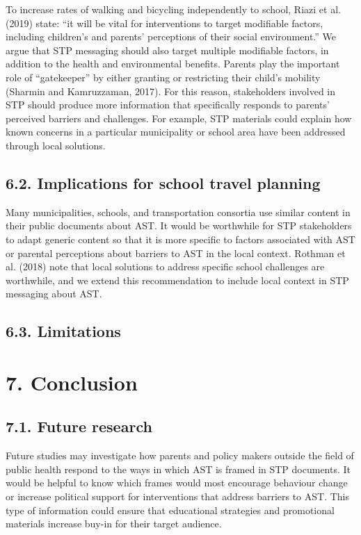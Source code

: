 \documentclass[]{elsarticle} %
\begin{document}
To increase rates of walking and bicycling independently to school,
Riazi et al. (2019) state: ``it will be vital for interventions to
target modifiable factors, including children's and parents' perceptions
of their social environment.'' We argue that STP messaging should also
target multiple modifiable factors, in addition to the health and
environmental benefits. Parents play the important role of
``gatekeeper'' by either granting or restricting their child's mobility
(Sharmin and Kamruzzaman, 2017). For this reason, stakeholders involved
in STP should produce more information that specifically responds to
parents' perceived barriers and challenges. For example, STP materials
could explain how known concerns in a particular municipality or school
area have been addressed through local solutions.

\hypertarget{implications-for-school-travel-planning}{%
\subsection{6.2. Implications for school travel
planning}\label{implications-for-school-travel-planning}}

Many municipalities, schools, and transportation consortia use similar
content in their public documents about AST. It would be worthwhile for
STP stakeholders to adapt generic content so that it is more specific to
factors associated with AST or parental perceptions about barriers to
AST in the local context. Rothman et al. (2018) note that local
solutions to address specific school challenges are worthwhile, and we
extend this recommendation to include local context in STP messaging
about AST.

\hypertarget{limitations}{%
\subsection{6.3. Limitations}\label{limitations}}

\hypertarget{conclusion}{%
\section{7. Conclusion}\label{conclusion}}

\hypertarget{future-research}{%
\subsection{7.1. Future research}\label{future-research}}

Future studies may investigate how parents and policy makers outside the
field of public health respond to the ways in which AST is framed in STP
documents. It would be helpful to know which frames would most encourage
behaviour change or increase political support for interventions that
address barriers to AST. This type of information could ensure that
educational strategies and promotional materials increase buy-in for
their target audience.
\end{document}
